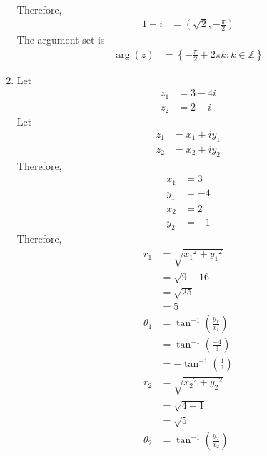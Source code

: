 \documentclass[fleqn, a4paper, 11pt, oneside]{amsart}
\theoremstyle{definition}
\theoremstyle{theorem}
\begin{document}
\begin{solution}
\begin{enumerate}[leftmargin=*]
\begin{align*}
			\end{align*}
			Therefore,
			\begin{align*}
				1 - i & = \left( \sqrt{2} , -\frac{\pi}{2} \right)
			\end{align*}
			The argument set is
			\begin{align*}
				\arg(z) & = \left\{ -\frac{\pi}{2} + 2 \pi k : k \in \mathbb{Z} \right\}
			\end{align*}
		\item
			Let
			\begin{align*}
				z_1 & = 3 - 4 i \\
				z_2 & = 2 - i
			\end{align*}
			Let
			\begin{align*}
				z_1 & = x_1 + i y_1 \\
				z_2 & = x_2 + i y_2
			\end{align*}
			Therefore,
			\begin{align*}
				x_1 & = 3  \\
				y_1 & = -4 \\
				x_2 & = 2  \\
				y_2 & = -1
			\end{align*}
			Therefore,
			\begin{align*}
				r_1      & = \sqrt{{x_1}^2 + {y_1}^2}                \\
                                         & = \sqrt{9 + 16}                           \\
                                         & = \sqrt{25}                               \\
                                         & = 5                                       \\
				\theta_1 & = \tan^{-1}\left( \frac{y_1}{x_1} \right) \\
                                         & = \tan^{-1}\left( \frac{-4}{3} \right)    \\
                                         & = -\tan^{-1}\left( \frac{4}{3} \right)    \\
				r_2      & = \sqrt{{x_2}^2 + {y_2}^2}                \\
                                         & = \sqrt{4 + 1}                            \\
                                         & = \sqrt{5}                                \\
				\theta_2 & = \tan^{-1}\left( \frac{y_2}{x_2} \right) \\

\end{align*}
\end{enumerate}
\end{solution}
\end{document}
